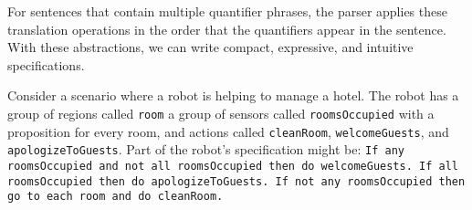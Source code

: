 \par
For sentences that contain multiple quantifier phrases, the parser applies these translation operations in the order that the quantifiers appear in the sentence. 
With these abstractions, we can write compact, expressive, and intuitive specifications. 
\par
\begin{myExample}\label{Ex:quantifiers} 	
	Consider a scenario where a robot is helping to manage a hotel. 
	The robot has a group of regions called \texttt{room} a group of sensors called \texttt{roomsOccupied} with a proposition for every room, and actions called \texttt{cleanRoom}, \texttt{welcomeGuests}, and \texttt{apologizeToGuests}. 
	Part of the robot's specification might be: 
	\texttt{If any roomsOccupied and not all roomsOccupied then do welcomeGuests. 
	If all roomsOccupied then do apologizeToGuests. 
	If not any roomsOccupied then go to each room and do cleanRoom. } 
\end{myExample}


